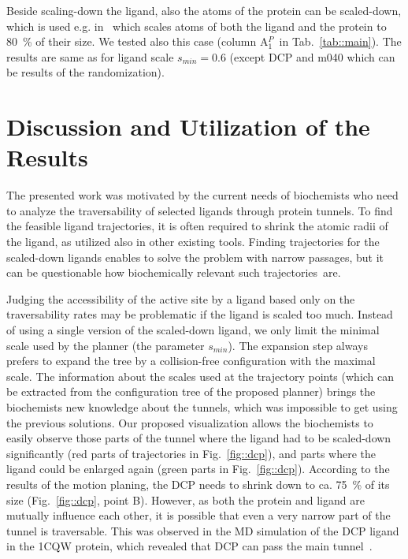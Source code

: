 \documentclass[usletter, 10pt, conference]{ieeeconf} %
\def\smin{s_{min}}
\def\RD{A$_1^P$}
\begin{document}
{Beside scaling-down the ligand, also the atoms of the protein can be scaled-down, which is used e.g. in~\cite{cortes2005path} which
scales  atoms of both the ligand and the protein to 80~\% of their size.
We tested also this case (column \RD\ in Tab.~\ref{tab::main}).
The results are same as for ligand scale $\smin=0.6$ (except DCP and m040 which can be results of the randomization).


\section{Discussion and Utilization of the Results}

The presented work was motivated by the current needs of biochemists who need to analyze the traversability of selected ligands through protein tunnels.
To find the feasible ligand trajectories, it is often required to shrink the atomic radii of the ligand, as utilized also in other existing tools.
Finding trajectories for the scaled-down ligands enables to solve the problem with narrow passages, but it can be questionable how biochemically relevant such trajectories~are.

Judging the accessibility of the active site by a ligand based only on the traversability rates may be problematic if the ligand is scaled too much.
Instead of using a single version of the scaled-down ligand, we only limit the minimal scale used by the planner (the parameter $\smin$).
The expansion step always prefers to expand the tree by a collision-free configuration with the maximal scale.
The information about the scales used at the trajectory points (which can be extracted from the configuration tree of the proposed planner) brings the biochemists new knowledge about the tunnels, which was impossible to get using the previous solutions.
Our proposed visualization allows the biochemists to easily observe those parts of the tunnel where the ligand had to be scaled-down significantly (red parts of trajectories in Fig.~\ref{fig::dcp}), and parts where the ligand could be enlarged again (green parts in Fig.~\ref{fig::dcp}).
According to the results of the motion planing, the DCP needs to shrink down to ca. 75~\% of its size (Fig.~\ref{fig::dcp}, point B).
However, as both the protein and ligand are mutually influence each other, it is possible that even a very narrow part of the tunnel is traversable.
This was observed in the MD simulation of the DCP ligand in the 1CQW protein, which revealed that DCP can pass the main tunnel~\cite{marques2017catalytic}.



}
\end{document}
